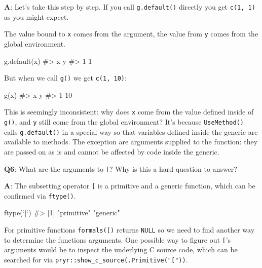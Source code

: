 \documentclass[
]{krantz}
\makeatletter
\newenvironment{Shaded}{\begin{snugshade}}{\end{snugshade}}
\newcommand{\CommentTok}[1]{\textcolor[rgb]{0.56,0.35,0.01}{\textit{#1}}}
\newcommand{\DataTypeTok}[1]{\textcolor[rgb]{0.13,0.29,0.53}{#1}}
\newcommand{\KeywordTok}[1]{\textcolor[rgb]{0.13,0.29,0.53}{\textbf{#1}}}
\newcommand{\NormalTok}[1]{#1}
\newcommand{\StringTok}[1]{\textcolor[rgb]{0.31,0.60,0.02}{#1}}
\newenvironment{kframe}{%
\medskip{}
\setlength{\fboxsep}{.8em}
 \def\at@end@of@kframe{}%
 \ifinner\ifhmode%
  \def\at@end@of@kframe{\end{minipage}}%
  \begin{minipage}{\columnwidth}%
 \fi\fi%
 \def\FrameCommand##1{\hskip\@totalleftmargin \hskip-\fboxsep
 \colorbox{shadecolor}{##1}\hskip-\fboxsep
     \hskip-\linewidth \hskip-\@totalleftmargin \hskip\columnwidth}%
 \MakeFramed {\advance\hsize-\width
   \@totalleftmargin\z@ \linewidth\hsize
   \@setminipage}}%
 {\par\unskip\endMakeFramed%
 \at@end@of@kframe}
\renewenvironment{Shaded}{\begin{kframe}}{\end{kframe}}
\renewcommand{\KeywordTok} [1]{\textcolor[rgb]{0.00,0.44,0.13}{{#1}}}
\renewcommand{\DataTypeTok}[1]{\textcolor[rgb]{0.56,0.13,0.00}{{#1}}}
\renewcommand{\StringTok}  [1]{\textcolor[rgb]{0.25,0.44,0.63}{{#1}}}
\renewcommand{\CommentTok} [1]{\textcolor[rgb]{0.38,0.63,0.69}{{#1}}}
\renewcommand{\NormalTok}  [1]{{#1}}
\makeatother
\begin{document}
\textbf{{A}}: Let's take this step by step. If you call \texttt{g.default()} directly you get \texttt{c(1,\ 1)} as you might expect.

The value bound to \texttt{x} comes from the argument, the value from \texttt{y} comes from the global environment.

\begin{Shaded}
\begin{Highlighting}[]
\KeywordTok{g.default}\NormalTok{(x)}
\CommentTok{#> x y }
\CommentTok{#> 1 1}
\end{Highlighting}
\end{Shaded}

But when we call \texttt{g()} we get \texttt{c(1,\ 10)}:

\begin{Shaded}
\begin{Highlighting}[]
\KeywordTok{g}\NormalTok{(x)}
\CommentTok{#>  x  y }
\CommentTok{#>  1 10}
\end{Highlighting}
\end{Shaded}

This is seemingly inconsistent: why does \texttt{x} come from the value defined inside of \texttt{g()}, and \texttt{y} still come from the global environment? It's because \texttt{UseMethod()} calls \texttt{g.default()} in a special way so that variables defined inside the generic are available to methods. The exception are arguments supplied to the function: they are passed on as is and cannot be affected by code inside the generic.

\textbf{{Q6}}: What are the arguments to \texttt{{[}}? Why is this a hard question to answer?

\textbf{{A}}: The subsetting operator \texttt{{[}} is a primitive and a generic function, which can be confirmed via \texttt{ftype()}.

\begin{Shaded}
\begin{Highlighting}[]
\KeywordTok{ftype}\NormalTok{(}\StringTok{`}\DataTypeTok{[}\StringTok{`}\NormalTok{)}
\CommentTok{#> [1] "primitive" "generic"}
\end{Highlighting}
\end{Shaded}

For primitive functions \texttt{formals({[})} returns \texttt{NULL} so we need to find another way to determine the functions arguments. One possible way to figure out \texttt{{[}}'s arguments would be to inspect the underlying C source code, which can be searched for via \texttt{pryr::show\_c\_source(.Primitive("{[}"))}.
\end{document}
